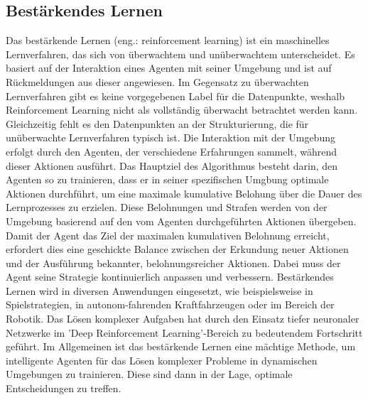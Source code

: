 \subsection{Bestärkendes Lernen}
Das bestärkende Lernen (eng.: reinforcement learning) ist ein maschinelles Lernverfahren, das sich von überwachtem und unüberwachtem unterscheidet. Es basiert auf der Interaktion eines Agenten mit seiner Umgebung und ist auf Rückmeldungen aus dieser angewiesen. Im Gegensatz zu überwachten Lernverfahren gibt es keine vorgegebenen Label für die Datenpunkte, weshalb Reinforcement Learning nicht als vollständig überwacht betrachtet werden kann. Gleichzeitig fehlt es den Datenpunkten an der Strukturierung, die für unüberwachte Lernverfahren typisch ist. Die Interaktion mit der Umgebung erfolgt durch den Agenten, der verschiedene Erfahrungen sammelt, während dieser Aktionen ausführt. Das Hauptziel des Algorithmus besteht darin, den Agenten so zu trainieren, dass er in seiner spezifischen Umgbung optimale Aktionen durchführt, um eine maximale kumulative Belohung über die Dauer des Lernprozesses zu erzielen. Diese Belohnungen und Strafen werden von der Umgebung basierend auf den vom Agenten durchgeführten Aktionen übergeben. Damit der Agent das Ziel der maximalen kumulativen Belohnung erreicht, erfordert dies eine geschickte Balance zwischen der Erkundung neuer Aktionen und der Ausführung bekannter, belohnungsreicher Aktionen. Dabei muss der Agent seine Strategie kontinuierlich anpassen und verbessern. Bestärkendes Lernen wird in diversen Anwendungen eingesetzt, wie beispielsweise in Spielstrategien, in autonom-fahrenden Kraftfahrzeugen oder im Bereich der Robotik. Das Lösen komplexer Aufgaben hat durch den Einsatz tiefer neuronaler Netzwerke im 'Deep Reinforcement Learning'-Bereich zu bedeutendem Fortschritt geführt. Im Allgemeinen ist das bestärkende Lernen eine mächtige Methode, um intelligente Agenten für das Lösen komplexer Probleme in dynamischen Umgebungen zu trainieren. Diese sind dann in der Lage, optimale Entscheidungen zu treffen.

